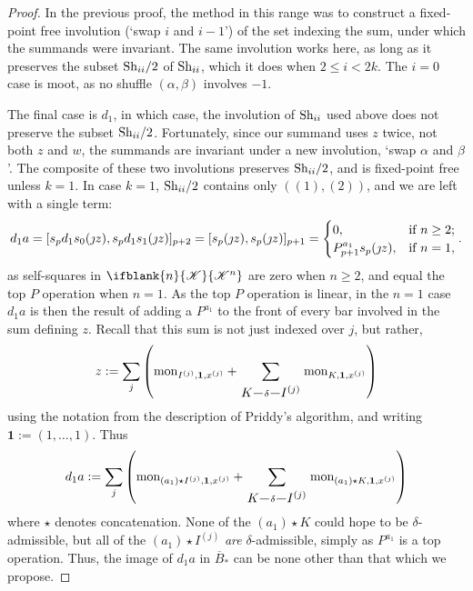 \documentclass[10pt]{article}
\makeatletter
\newcommand{\LL}[1]{\ifblank{#1}{\scrK}{\scrK^{#1}}}
\newcommand{\produces}[3]{{#1}{#3}{#2}}
\newcommand{\BarMonomial}[3]{\textup{mon}_{#1,#2,#3}}
\newcommand{\Shuffles}[2]{\textup{Sh}_{#1#2}}
\newcommand{\HalfShuffles}[2]{\textup{Sh}_{#1#2}/2}
\renewcommand{\produces}[3]{
{
\def\labelstyle{\scriptstyle}
\xymatrix@C=2em@1{
{#1}
\ar@{-}[r]|-{{\,#3\,}}
&%
{#2}%
}}}
\makeatother
\begin{document}
\begin{LieLambdaStructureOnKoszul}
\begin{proof}
In the previous proof, the method in this range was to construct a fixed-point free involution (`swap $i$ and $i-1$') of the set indexing the sum, under which the summands were invariant. The same involution works here, as long as it preserves the subset $\HalfShuffles{i}{i}$ of $\Shuffles{i}{i}$, which it does when $2\leq i<2k$. The $i=0$ case is moot, as no shuffle $(\alpha,\beta)$ involves $-1$.


The final case is $d_1$, in which case, the involution of $\Shuffles{i}{i}$ used above does not preserve the subset $\HalfShuffles{i}{i}$. Fortunately, since our summand uses $z$ twice, not both $z$ and $w$, the summands are invariant under a new involution, `swap $\alpha$ and $\beta$'. The composite of these two involutions preserves $\HalfShuffles{i}{i}$, and is fixed-point free unless $k=1$. In case $k=1$, $\HalfShuffles{i}{i}$ contains only $((1),(2))$, and we are left with a single term:
\[d_1a=[s_{p}d_1s_0(\jmath z), s_{p}d_1s_1(\jmath z)]_{p+2}=[s_{p}(\jmath z), s_{p}(\jmath z)]_{p+1}=\begin{cases}
0,&\textup{if }n\geq2;\\
P^{a_1}_{p+1}s_{p}(\jmath z),&\textup{if }n=1,
\end{cases}
.\]
as self-squares in $\LL{n}$ are zero when $n\geq2$, and equal the top $P$ operation when $n=1$. As the top $P$ operation is linear, in the $n=1$ case $d_1a$ is then the result of adding a $P^{a_1}$ to the front of every bar involved in the sum defining $z$. Recall that this sum is not just indexed over $j$, but rather,
\[z:=\sum_j\left(\BarMonomial{I^{(j)}}{\textbf{1}}{x^{(j)}}+\sum_{\produces{K}{I^{(j)}}{\delta}}\BarMonomial{K}{\textbf{1}}{x^{(j)}}\right)\]
using the notation from the description of Priddy's algorithm, and writing $\textbf{1}:=(1,\ldots,1)$. Thus
\[d_1a:=\sum_j\left(\BarMonomial{(a_1)\star I^{(j)}}{\textbf{1}}{x^{(j)}}+\sum_{\produces{K}{I^{(j)}}{\delta}}\BarMonomial{(a_1)\star K}{\textbf{1}}{x^{(j)}}\right)\]
where $\star$ denotes concatenation. None of the $(a_1)\star K$ could hope to be $\delta$-admissible, but all of the $(a_1)\star I^{(j)}$ \emph{are} $\delta$-admissible, simply as $P^{a_1}$ is a top operation. Thus, the image of $d_1a$ in $\overline{B}_*$ can be none other than that which we propose.

\end{proof}
\end{LieLambdaStructureOnKoszul}
\end{document}
